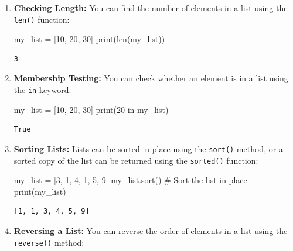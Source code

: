 \documentclass[
  letterpaper,
  DIV=11,
  numbers=noendperiod]{scrreprt}
\newenvironment{Shaded}{\begin{snugshade}}{\end{snugshade}}
\newcommand{\BuiltInTok}[1]{\textcolor[rgb]{0.00,0.23,0.31}{#1}}
\newcommand{\CommentTok}[1]{\textcolor[rgb]{0.37,0.37,0.37}{#1}}
\newcommand{\DecValTok}[1]{\textcolor[rgb]{0.68,0.00,0.00}{#1}}
\newcommand{\KeywordTok}[1]{\textcolor[rgb]{0.00,0.23,0.31}{#1}}
\newcommand{\NormalTok}[1]{\textcolor[rgb]{0.00,0.23,0.31}{#1}}
\newcommand{\OperatorTok}[1]{\textcolor[rgb]{0.37,0.37,0.37}{#1}}
\begin{document}
\begin{enumerate}
\def\labelenumi{\arabic{enumi}.}
\item
  \textbf{Checking Length:} You can find the number of elements in a
  list using the \texttt{len()} function:

\begin{Shaded}
\begin{Highlighting}[]
\NormalTok{my\_list }\OperatorTok{=}\NormalTok{ [}\DecValTok{10}\NormalTok{, }\DecValTok{20}\NormalTok{, }\DecValTok{30}\NormalTok{]}
\BuiltInTok{print}\NormalTok{(}\BuiltInTok{len}\NormalTok{(my\_list))}
\end{Highlighting}
\end{Shaded}

\begin{verbatim}
3
\end{verbatim}
\item
  \textbf{Membership Testing:} You can check whether an element is in a
  list using the \texttt{in} keyword:

\begin{Shaded}
\begin{Highlighting}[]
\NormalTok{my\_list }\OperatorTok{=}\NormalTok{ [}\DecValTok{10}\NormalTok{, }\DecValTok{20}\NormalTok{, }\DecValTok{30}\NormalTok{]}
\BuiltInTok{print}\NormalTok{(}\DecValTok{20} \KeywordTok{in}\NormalTok{ my\_list) }
\end{Highlighting}
\end{Shaded}

\begin{verbatim}
True
\end{verbatim}
\item
  \textbf{Sorting Lists:} Lists can be sorted in place using the
  \texttt{sort()} method, or a sorted copy of the list can be returned
  using the \texttt{sorted()} function:

\begin{Shaded}
\begin{Highlighting}[]
\NormalTok{my\_list }\OperatorTok{=}\NormalTok{ [}\DecValTok{3}\NormalTok{, }\DecValTok{1}\NormalTok{, }\DecValTok{4}\NormalTok{, }\DecValTok{1}\NormalTok{, }\DecValTok{5}\NormalTok{, }\DecValTok{9}\NormalTok{]}
\NormalTok{my\_list.sort()  }\CommentTok{\# Sort the list in place}
\BuiltInTok{print}\NormalTok{(my\_list)}
\end{Highlighting}
\end{Shaded}

\begin{verbatim}
[1, 1, 3, 4, 5, 9]
\end{verbatim}
\item
  \textbf{Reversing a List:} You can reverse the order of elements in a
  list using the \texttt{reverse()} method:


\end{enumerate}
\end{document}
